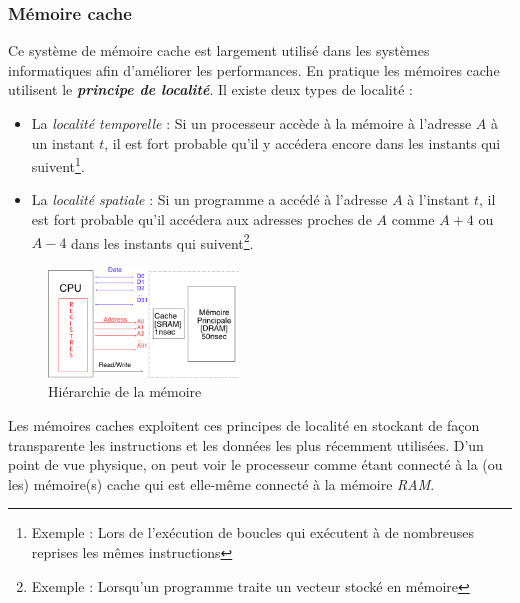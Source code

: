 \subsubsection*{Mémoire cache}

Ce système de mémoire cache est largement utilisé dans les systèmes informatiques afin d'améliorer les performances.
En pratique les mémoires cache utilisent le \textit{\textbf{principe de localité}}.
Il existe deux types de localité :
\begin{itemize}
  \item La \emph{localité temporelle} : Si un processeur accède à la mémoire à l'adresse $A$ à un instant $t$, il est fort probable qu'il y accédera encore dans les instants qui suivent\footnote{Exemple : Lors de l'exécution de boucles qui exécutent à de nombreuses reprises les mêmes instructions}.
  \item La \emph{localité spatiale} : Si un programme a accédé à l'adresse $A$ à l'instant $t$, il est fort probable qu'il accédera aux adresses proches de $A$ comme $A+4$ ou $A-4$ dans les instants qui suivent\footnote{Exemple : Lorsqu'un programme traite un vecteur stocké en mémoire}.
\end{itemize}
\begin{figure}
  \vspace{-0.5cm}
  \includegraphics[width=0.45\textwidth]{memhierarchie}
  \caption{\label{fig:memhierarchie}Hiérarchie de la mémoire}
  \vspace{-0.5cm}
\end{figure}

Les mémoires caches exploitent ces principes de localité en stockant de façon transparente les instructions et les données les plus récemment utilisées.
D'un point de vue physique, on peut voir le processeur comme étant connecté à la (ou les) mémoire(s) cache qui est elle-même connecté à la mémoire \textit{RAM}.\\



